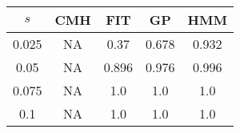 \centering \begin{tabular}{c|c|c|c|c}
$s$	&CMH	&FIT	&GP	&HMM\\\hline
0.025	&NA	&0.37	&0.678	&0.932\\
0.05	&NA	&0.896	&0.976	&0.996\\
0.075	&NA	&1.0	&1.0	&1.0\\
0.1	&NA	&1.0	&1.0	&1.0\\
\end{tabular}
